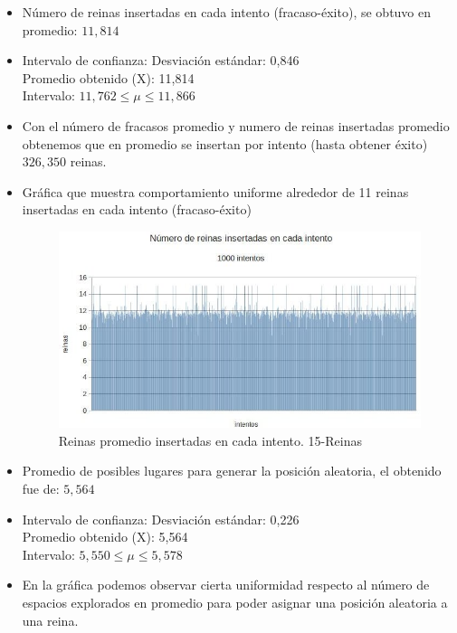 \documentclass[a4paper,10pt]{article}
\begin{document}
\begin{itemize}
\item Número de reinas insertadas en cada intento (fracaso-éxito), se obtuvo en promedio: $11,814$
\item Intervalo de confianza:
  Desviación estándar: 0,846 \\
  Promedio obtenido (X): 11,814\\
  Intervalo: $ 11,762  \leq \mu \leq 11,866$ \\

\item Con el número de fracasos promedio y numero de reinas insertadas promedio obtenemos que en promedio se insertan por intento (hasta obtener éxito) $326,350$ reinas.
\item Gráfica que muestra comportamiento uniforme alrededor de 11 reinas insertadas en cada intento (fracaso-éxito)

\begin{figure}
 \centering
 \includegraphics[scale=0.5]{reinas15.jpg}
 \caption{Reinas promedio insertadas en cada intento. 15-Reinas}
 \label{fig:rinas10}
\end{figure}

\item Promedio de posibles lugares para generar la posición aleatoria, el obtenido fue de: $5,564$
\item Intervalo de confianza:
  Desviación estándar: 0,226 \\
  Promedio obtenido (X): 5,564\\
  Intervalo: $ 5,550 \leq \mu \leq 5,578$ \\

\item En la gráfica podemos observar cierta uniformidad respecto al número de espacios explorados en promedio para poder asignar una posición aleatoria a una reina.


\end{itemize}
\end{document}
